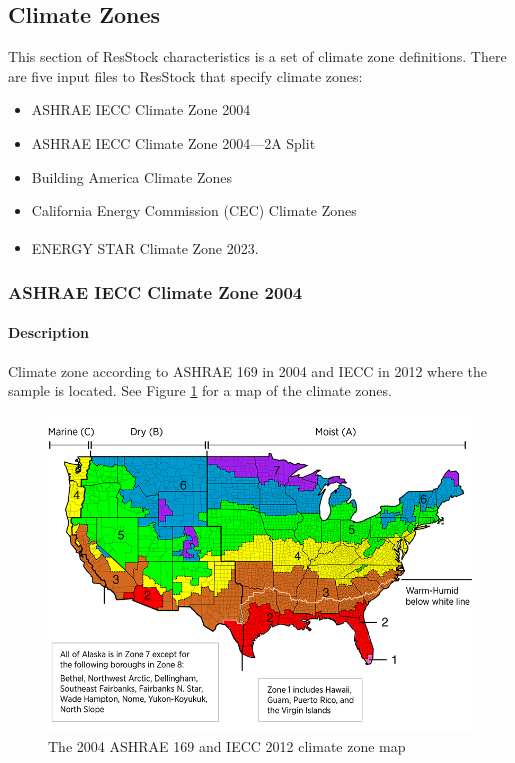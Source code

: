 \subsection{Climate Zones}
This section of ResStock characteristics is a set of climate zone definitions. There are five input files to ResStock that specify climate zones:
\begin{itemize}
    \item ASHRAE IECC Climate Zone 2004
    \item ASHRAE IECC Climate Zone 2004---2A Split
    \item Building America Climate Zones
    \item California Energy Commission (CEC) Climate Zones
    \item ENERGY STAR\textsuperscript{\textregistered} Climate Zone 2023.
\end{itemize}
\subsubsection{ASHRAE IECC Climate Zone 2004} \label{sec:ashrae_2004_tsv}
\paragraph{Description}
Climate zone according to ASHRAE 169 in 2004 and IECC in 2012 where the sample is located. See Figure \ref{fig:ashrae_169_2004_cz} for a map of the climate zones.

\begin{figure}
    \centering
    \includegraphics[width=1\linewidth]{images/ashrae_iecc_cz_map_2004.jpg}
    \caption{The 2004 ASHRAE 169 and IECC 2012 climate zone map}
    \label{fig:ashrae_169_2004_cz}
\end{figure}

